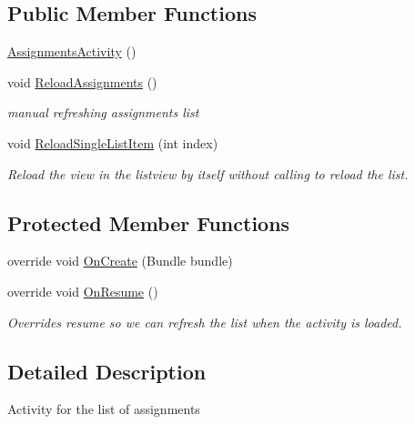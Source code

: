 \subsection*{Public Member Functions}
\begin{DoxyCompactItemize}
\item 
\hyperlink{class_field_service_1_1_android_1_1_assignments_activity_a36f7e573d341081da26922edf8eed9c0}{Assignments\+Activity} ()
\item 
void \hyperlink{class_field_service_1_1_android_1_1_assignments_activity_af99461fd32e64b4fbadce4ad0491eb2c}{Reload\+Assignments} ()
\begin{DoxyCompactList}\small\item\em manual refreshing assignments list \end{DoxyCompactList}\item 
void \hyperlink{class_field_service_1_1_android_1_1_assignments_activity_a67e4ac127c3e414148a20e8986207a85}{Reload\+Single\+List\+Item} (int index)
\begin{DoxyCompactList}\small\item\em Reload the view in the listview by itself without calling to reload the list. \end{DoxyCompactList}\end{DoxyCompactItemize}
\subsection*{Protected Member Functions}
\begin{DoxyCompactItemize}
\item 
override void \hyperlink{class_field_service_1_1_android_1_1_assignments_activity_abe1d6f336f02b0d5663b76b362adb459}{On\+Create} (Bundle bundle)
\item 
override void \hyperlink{class_field_service_1_1_android_1_1_assignments_activity_ae999f4999d9a06a11cf7aa4012214532}{On\+Resume} ()
\begin{DoxyCompactList}\small\item\em Overrides resume so we can refresh the list when the activity is loaded. \end{DoxyCompactList}\end{DoxyCompactItemize}


\subsection{Detailed Description}
Activity for the list of assignments 



